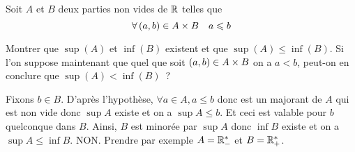 \documentclass{magnolia}
\begin{document}







Soit $A$ et $B$ deux parties non vides de $\mathbb{R}$ telles que 
\[\forall\left(a,b\right)\in A\times B \quad a\leqslant b\]
\begin{questions}
\question Montrer que $\sup(A)$ et $\inf(B)$ existent et que
  $\sup(A)\leq \inf(B)$. 
\question Si l'on suppose maintenant que quel que soit $\left(a,b\right)\in A\times B$ on
  a $a< b$, peut-on en conclure que $\sup(A)<\inf(B)$~?
\end{questions}

\begin{sol}
\begin{questions}
\question Fixons $b\in B$. D'après l'hypothèse,  $\forall a \in A, a\leq b$  donc est un majorant de $A$ qui est non vide donc $\sup A$ existe et on a $\sup A \leq b$. Et ceci est valable pour $b$ quelconque dans $B$. Ainsi, $B$ est minorée par $\sup A$ donc $\inf B$ existe et on a $\sup A \leq \inf B$.
\question NON. Prendre par exemple $A=\mathbb{R}_-^*$ et $B=\mathbb{R}_+^*$.
\end{questions}
\end{sol}
\end{document}
